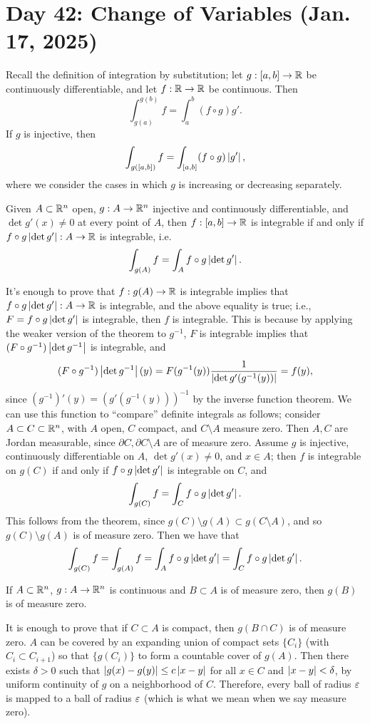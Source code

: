 \section{Day 42: Change of Variables (Jan. 17, 2025)}
Recall the definition of integration by substitution; let $g : [a, b] \to \mathbb R$ be continuously differentiable, and let $f : \mathbb R \to \mathbb R$ be continuous. Then
\[ \int_{g(a)}^{g(b)} f = \int_a^b (f \circ g) g'. \]
If $g$ is injective, then
\[ \int_{g([a, b])} f = \int_{[a, b]} (f \circ g) \left\lvert g' \right\rvert, \]
where we consider the cases in which $g$ is increasing or decreasing separately.
\begin{simplethm}
    Given $A \subset \mathbb R^n$ open, $g : A \to \mathbb R^n$ injective and continuously differentiable, and $\det g'(x) \neq 0$ at every point of $A$, then $f : [a, b] \to \mathbb R$ is integrable if and only if $f \circ g \left\lvert \det g' \right\rvert : A \to \mathbb R$ is integrable, i.e.
    \[ \int_{g(A)} f = \int_A f \circ g \left\lvert \det g' \right\rvert. \] 
\end{simplethm}
\noindent It's enough to prove that $f : g(A) \to \mathbb R$ is integrable implies that $f \circ g \left\lvert \det g' \right\rvert : A \to \mathbb R$ is integrable, and the above equality is true; i.e., $F = f \circ g \left\lvert \det g' \right\rvert$ is integrable, then $f$ is integrable. This is because by applying the weaker version of the theorem to $g^{-1}$, $F$ is integrable implies that $(F \circ g^{-1}) \left\lvert \det g^{-1} \right\rvert$ is integrable, and
\[ (F \circ g^{-1}) \left\lvert \det g^{-1} \right\rvert (y) = F(g^{-1}(y)) \frac{1}{\left\lvert \det g'(g^{-1}(y)) \right\rvert} = f(y), \]
since $(g^{-1})'(y) = (g'(g^{-1}(y)))^{-1}$ by the inverse function theorem. We can use this function to ``compare'' definite integrals as follows; consider $A \subset C \subset \mathbb R^n$, with $A$ open, $C$ compact, and $C \setminus A$ measure zero. Then $A, C$ are Jordan measurable, since $\partial C, \partial C \setminus A$ are of measure zero. Assume $g$ is injective, continuously differentiable on $A$, $\det g'(x) \neq 0$, and $x \in A$; then $f$ is integrable on $g(C)$ if and only if $f \circ g \left\lvert \det g' \right\rvert$ is integrable on $C$, and
\[ \int_{g(C)} f = \int_C f \circ g \left\lvert \det g' \right\rvert. \]
This follows from the theorem, since $g(C) \setminus g(A) \subset g(C \setminus A)$, and so $g(C) \setminus g(A)$ is of measure zero. Then we have that
\[ \int_{g(C)} f = \int_{g(A)} f = \int_A f \circ g \left\lvert \det g' \right\rvert = \int_C f \circ g \left\lvert \det g' \right\rvert. \]
\begin{simplelemma}
    If $A \subset \mathbb R^n$, $g : A \to \mathbb R^n$ is continuous and $B \subset A$ is of measure zero, then $g(B)$ is of measure zero.
\end{simplelemma}
\noindent It is enough to prove that if $C \subset A$ is compact, then $g(B \cap C)$ is of measure zero. $A$ can be covered by an expanding union of compact sets $\{C_i\}$ (with $C_i \subset C_{i+1}$) so that $\{g(C_i)\}$ to form a countable cover of $g(A)$. Then there exists $\delta > 0$ such that $\left\lvert g(x) - g(y) \right\rvert \leq c \left\lvert x - y \right\rvert$ for all $x \in C$ and $\left\lvert x - y \right\rvert < \delta$, by uniform continuity of $g$ on a neighborhood of $C$. Therefore, every ball of radius $\varepsilon$ is mapped to a ball of radius $\varepsilon$ (which is what we mean when we say measure zero).